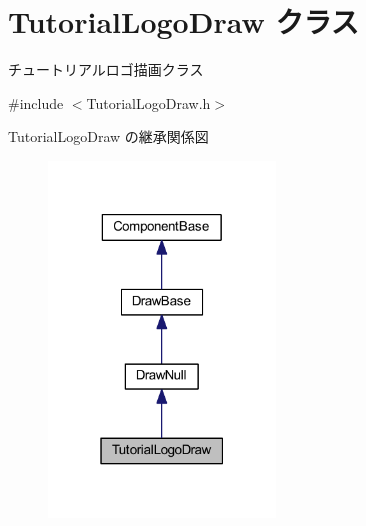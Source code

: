 \hypertarget{class_tutorial_logo_draw}{}\section{Tutorial\+Logo\+Draw クラス}
\label{class_tutorial_logo_draw}


チュートリアルロゴ描画クラス  




{\ttfamily \#include $<$Tutorial\+Logo\+Draw.\+h$>$}



Tutorial\+Logo\+Draw の継承関係図\nopagebreak
\begin{figure}[H]
\begin{center}
\leavevmode
\includegraphics[width=171pt]{class_tutorial_logo_draw__inherit__graph}
\end{center}
\end{figure}
